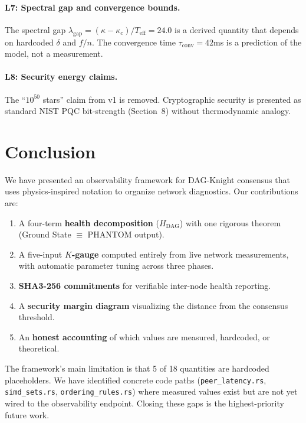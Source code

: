 \documentclass[11pt,a4paper,twocolumn]{article}
\begin{document}
\paragraph{L7: Spectral gap and convergence bounds.} The spectral gap $\lambda_{\text{gap}} = (\kappa - \kappa_c)/T_{\text{eff}} = 24.0$ is a derived quantity that depends on hardcoded $\delta$ and $f/n$. The convergence time $\tau_{\text{conv}} = 42$ms is a prediction of the model, not a measurement.

\paragraph{L8: Security energy claims.} The ``$10^{50}$ stars'' claim from v1 is removed. Cryptographic security is presented as standard NIST PQC bit-strength (Section~8) without thermodynamic analogy.

\section{Conclusion}

We have presented an observability framework for DAG-Knight consensus that uses physics-inspired notation to organize network diagnostics. Our contributions are:

\begin{enumerate}[nosep]
    \item A four-term \textbf{health decomposition} ($H_{\text{DAG}}$) with one rigorous theorem (Ground State $\equiv$ PHANTOM output).
    \item A five-input \textbf{$K$-gauge} computed entirely from live network measurements, with automatic parameter tuning across three phases.
    \item \textbf{SHA3-256 commitments} for verifiable inter-node health reporting.
    \item A \textbf{security margin diagram} visualizing the distance from the consensus threshold.
    \item An \textbf{honest accounting} of which values are measured, hardcoded, or theoretical.
\end{enumerate}

The framework's main limitation is that 5 of 18 quantities are hardcoded placeholders. We have identified concrete code paths (\texttt{peer\_latency.rs}, \texttt{simd\_sets.rs}, \texttt{ordering\_rules.rs}) where measured values exist but are not yet wired to the observability endpoint. Closing these gaps is the highest-priority future work.
\end{document}

